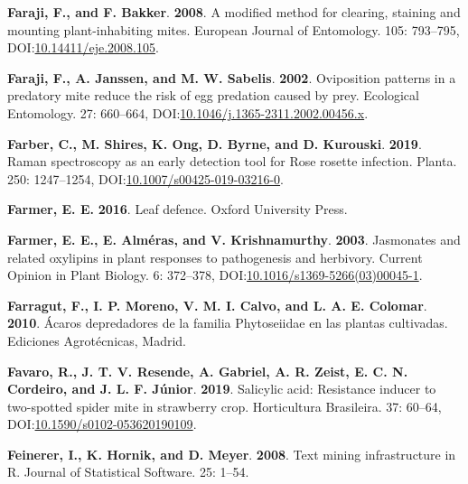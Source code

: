 \documentclass[12pt,final,CPage]{ufthesis}
\newlength{\cslhangindent}
\newenvironment{CSLReferences}[2] %
{%
	\setlength{\parindent}{0pt}
	\ifodd #1 \everypar{\setlength{\hangindent}{\cslhangindent}}\ignorespaces\fi
	\ifnum #2 > 0
	\setlength{\parskip}{#2\baselineskip}
	\fi
}%
{}
\begin{document}
{\begin{CSLReferences}{1}{0}
  \leavevmode{}%
  \textbf{Faraji, F., and F. Bakker}. \textbf{2008}. A modified method for clearing, staining and mounting plant-inhabiting mites. European Journal of Entomology. 105: 793--795, DOI:\href{https://doi.org/10.14411/eje.2008.105}{10.14411/eje.2008.105}.

  \leavevmode{}%
  \textbf{Faraji, F., A. Janssen, and M. W. Sabelis}. \textbf{2002}. Oviposition patterns in a predatory mite reduce the risk of egg predation caused by prey. Ecological Entomology. 27: 660--664, DOI:\href{https://doi.org/10.1046/j.1365-2311.2002.00456.x}{10.1046/j.1365-2311.2002.00456.x}.

  \leavevmode{}%
  \textbf{Farber, C., M. Shires, K. Ong, D. Byrne, and D. Kurouski}. \textbf{2019}. {Raman} spectroscopy as an early detection tool for {Rose rosette} infection. Planta. 250: 1247--1254, DOI:\href{https://doi.org/10.1007/s00425-019-03216-0}{10.1007/s00425-019-03216-0}.

  \leavevmode{}%
  \textbf{Farmer, E. E.} \textbf{2016}. Leaf defence. Oxford University Press.

  \leavevmode{}%
  \textbf{Farmer, E. E., E. Alméras, and V. Krishnamurthy}. \textbf{2003}. Jasmonates and related oxylipins in plant responses to pathogenesis and herbivory. Current Opinion in Plant Biology. 6: 372--378, DOI:\href{https://doi.org/10.1016/s1369-5266(03)00045-1}{10.1016/s1369-5266(03)00045-1}.

  \leavevmode{}%
  \textbf{Farragut, F., I. P. Moreno, V. M. I. Calvo, and L. A. E. Colomar}. \textbf{2010}. {Á}caros depredadores de la familia {Phytoseiidae} en las plantas cultivadas. Ediciones Agrot{é}cnicas, Madrid.

  \leavevmode{}%
  \textbf{Favaro, R., J. T. V. Resende, A. Gabriel, A. R. Zeist, E. C. N. Cordeiro, and J. L. F. Júnior}. \textbf{2019}. Salicylic acid: Resistance inducer to two-spotted spider mite in strawberry crop. Horticultura Brasileira. 37: 60--64, DOI:\href{https://doi.org/10.1590/s0102-053620190109}{10.1590/s0102-053620190109}.

  \leavevmode{}%
  \textbf{Feinerer, I., K. Hornik, and D. Meyer}. \textbf{2008}. Text mining infrastructure in {R}. Journal of Statistical Software. 25: 1--54.


\end{CSLReferences}}
\end{document}
